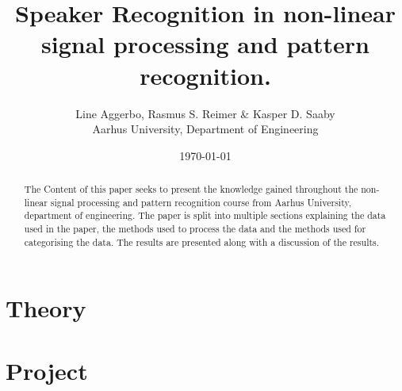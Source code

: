 

\title{
	\textbf{Speaker Recognition in non-linear signal processing and pattern recognition.
	}
}

\author{
	Line Aggerbo, Rasmus S. Reimer \& Kasper D. Saaby\\
	Aarhus University, Department of Engineering \\
}
\date{\today}




\maketitle


\begin{abstract}
The Content of this paper seeks to present the knowledge gained throughout the non-linear signal processing and pattern recognition course from Aarhus University, department of engineering. The paper is split into multiple sections explaining the data used in the paper, the methods used to process the data and the methods used for categorising the data. The results are presented along with a discussion of the results.
\end{abstract}


\chapter{Theory}








\chapter{Project}




